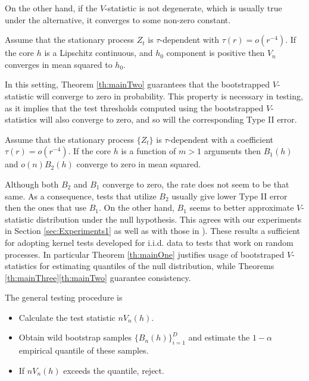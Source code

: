 On the other hand, if the $V$-statistic is not degenerate, which is usually true under the alternative, it converges to some non-zero constant. 
\begin{Theorem}
\label{th:mainThree}
Assume that the stationary process $Z_t$ is $\tau$-dependent with $\tau(r) = o(r^{-4})$. If the core $h$ is a Lipschitz continuous, and  $h_0$ component is positive then  $V_n$ converges in mean squared to $h_0$.
\end{Theorem}
In this setting, Theorem \ref{th:mainTwo} guarantees that the bootstrapped $V$-statistic will converge to zero in probability. This property is necessary in testing, as it implies that the test thresholds computed using the bootstrapped $V$-statistics will also converge to zero, and so will the corresponding Type II error.   
\begin{Theorem}
\label{th:mainTwo}
Assume that the stationary process $\{Z_t\}$ is $\tau$-dependent with a coefficient $\tau(r) = o(r^{-4})$. If the core $h$ is  a function of $m>1$ arguments then $B_1(h)$ and $o(n) B_2(h)$  converge to zero in mean squared. 
\end{Theorem}
Although both $B_2$ and $B_1$  converge to zero, the rate does not seem to be that same. As a consequence, tests that utilize $B_2$ usually give lower Type II error then the ones that use $B_1$. On the other hand, $B_1$ seems to better approximate $V$-statistic distribution under the null hypothesis. This agrees with our experiments in Section \ref{sec:Experiments1} as well as with those in \cite[Section 5]{leucht_dependent_2013}).  
These results a sufficient for adopting kernel tests developed for i.i.d. data to tests that work on random processes. In particular Theorem \ref{th:mainOne}  justifies usage of bootstraped $V$-statistics for estimating quantiles of the null distribution, while Theorems \ref{th:mainThree}\ref{th:mainTwo} guarantee consistency.

The general testing procedure is 

\begin{itemize}
\item Calculate the test statistic $n V_{n}(h)$.

\item Obtain wild bootstrap samples $\{B_{n}(h)\}_{i=1}^{D}$
and estimate the $1-\alpha$ empirical quantile of these samples. 
\item If $n V_{n}(h)$ exceeds the quantile, reject.
\end{itemize}




